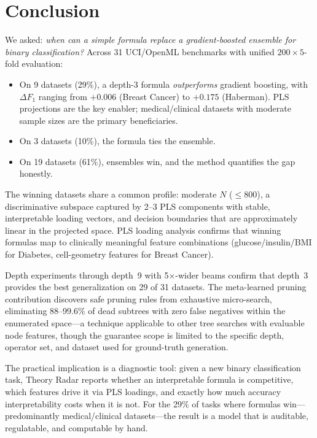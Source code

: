 \documentclass[journal]{IEEEtran}
\begin{document}
\section{Conclusion}

We asked: \emph{when can a simple formula replace a gradient-boosted
ensemble for binary classification?}  Across 31 UCI/OpenML
benchmarks with unified $200 \times 5$-fold evaluation:

\begin{itemize}
\item On 9 datasets (29\%), a depth-3 formula \emph{outperforms}
gradient boosting, with $\Delta F_1$ ranging from $+0.006$
(Breast Cancer) to $+0.175$ (Haberman).  PLS projections are the
key enabler; medical/clinical datasets with moderate sample sizes
are the primary beneficiaries.
\item On 3 datasets (10\%), the formula ties the ensemble.
\item On 19 datasets (61\%), ensembles win, and the method
quantifies the gap honestly.
\end{itemize}

The winning datasets share a common profile: moderate $N$
($\leq 800$), a discriminative subspace captured by 2--3 PLS
components with stable, interpretable loading vectors, and
decision boundaries that are approximately linear in the projected
space.  PLS loading analysis confirms that winning formulas map to
clinically meaningful feature combinations (glucose/insulin/BMI
for Diabetes, cell-geometry features for Breast Cancer).

Depth experiments through depth~9 with 5$\times$-wider beams confirm
that depth~3 provides the best generalization on 29 of 31 datasets.
The meta-learned pruning contribution discovers safe pruning rules
from exhaustive micro-search, eliminating 88--99.6\% of dead
subtrees with zero false negatives within the enumerated
space---a technique applicable to other tree searches with
evaluable node features, though the guarantee scope is limited
to the specific depth, operator set, and dataset used for
ground-truth generation.

The practical implication is a diagnostic tool: given a new binary
classification task, Theory Radar reports whether an interpretable
formula is competitive, which features drive it via PLS loadings,
and exactly how much accuracy interpretability costs when it is not.
For the 29\% of tasks where formulas win---predominantly
medical/clinical datasets---the result is a model that is auditable,
regulatable, and computable by hand.
\end{document}

